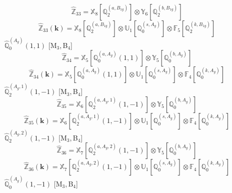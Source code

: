 \documentclass[fleqn,10pt,landscape]{article}
\begin{document}
\begin{itemize}
\begin{dmath*}
\hat{\mathbb{Z}}_{33}=\mathbb{X}_{8}[\mathbb{Q}_{2}^{(a,B_{1g})}] \otimes\mathbb{Y}_{6}[\mathbb{Q}_{2}^{(b,B_{1g})}]
\end{dmath*}
\begin{dmath*}
\hat{\mathbb{Z}}_{33}(\bm{k})=\mathbb{X}_{8}[\mathbb{Q}_{2}^{(a,B_{1g})}] \otimes\mathbb{U}_{1}[\mathbb{Q}_{0}^{(s,A_{g})}] \otimes\mathbb{F}_{5}[\mathbb{Q}_{2}^{(k,B_{1g})}]
\end{dmath*}
\vspace{4mm}
\noindent {} $\,\,\,\hat{\mathbb{Q}}_{0}^{(A_{g})}(1,1)$ [M$_{3}$,\,B$_{4}$]
\begin{dmath*}
\hat{\mathbb{Z}}_{34}=\mathbb{X}_{5}[\mathbb{Q}_{0}^{(a,A_{g})}(1,1)] \otimes\mathbb{Y}_{5}[\mathbb{Q}_{0}^{(b,A_{g})}]
\end{dmath*}
\begin{dmath*}
\hat{\mathbb{Z}}_{34}(\bm{k})=\mathbb{X}_{5}[\mathbb{Q}_{0}^{(a,A_{g})}(1,1)] \otimes\mathbb{U}_{1}[\mathbb{Q}_{0}^{(s,A_{g})}] \otimes\mathbb{F}_{4}[\mathbb{Q}_{0}^{(k,A_{g})}]
\end{dmath*}
\vspace{4mm}
\noindent {} $\,\,\,\hat{\mathbb{Q}}_{2}^{(A_{g},1)}(1,-1)$ [M$_{3}$,\,B$_{4}$]
\begin{dmath*}
\hat{\mathbb{Z}}_{35}=\mathbb{X}_{6}[\mathbb{Q}_{2}^{(a,A_{g},1)}(1,-1)] \otimes\mathbb{Y}_{5}[\mathbb{Q}_{0}^{(b,A_{g})}]
\end{dmath*}
\begin{dmath*}
\hat{\mathbb{Z}}_{35}(\bm{k})=\mathbb{X}_{6}[\mathbb{Q}_{2}^{(a,A_{g},1)}(1,-1)] \otimes\mathbb{U}_{1}[\mathbb{Q}_{0}^{(s,A_{g})}] \otimes\mathbb{F}_{4}[\mathbb{Q}_{0}^{(k,A_{g})}]
\end{dmath*}
\vspace{4mm}
\noindent {} $\,\,\,\hat{\mathbb{Q}}_{2}^{(A_{g},2)}(1,-1)$ [M$_{3}$,\,B$_{4}$]
\begin{dmath*}
\hat{\mathbb{Z}}_{36}=\mathbb{X}_{7}[\mathbb{Q}_{2}^{(a,A_{g},2)}(1,-1)] \otimes\mathbb{Y}_{5}[\mathbb{Q}_{0}^{(b,A_{g})}]
\end{dmath*}
\begin{dmath*}
\hat{\mathbb{Z}}_{36}(\bm{k})=\mathbb{X}_{7}[\mathbb{Q}_{2}^{(a,A_{g},2)}(1,-1)] \otimes\mathbb{U}_{1}[\mathbb{Q}_{0}^{(s,A_{g})}] \otimes\mathbb{F}_{4}[\mathbb{Q}_{0}^{(k,A_{g})}]
\end{dmath*}
\vspace{4mm}
\noindent {} $\,\,\,\hat{\mathbb{Q}}_{0}^{(A_{g})}(1,-1)$ [M$_{3}$,\,B$_{4}$]
\begin{dmath*}

\end{dmath*}
\end{itemize}
\end{document}
